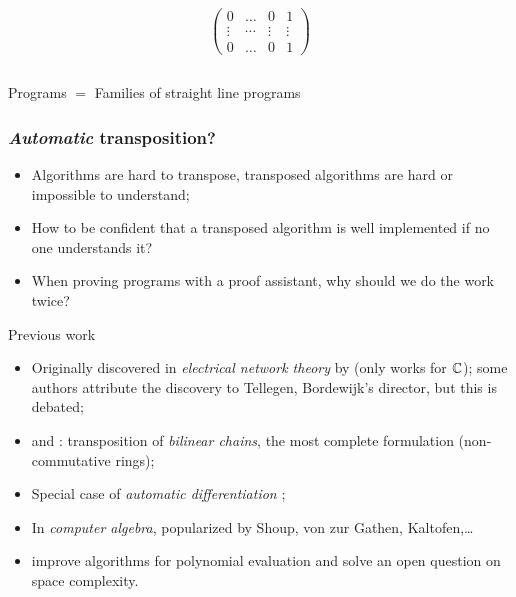 \documentclass[10pt,usepdftitle=false]{beamer}
\begin{document}
\begin{frame}[fragile]
\begin{columns}
    \begin{column}{0.5\textwidth}
      \begin{equation*}
        \begin{pmatrix}
          0 & \hdots & 0 & 1\\
          \vdots  &  \cdots & \vdots & \vdots \\
          0 & \hdots & 0 & 1
        \end{pmatrix}
      \end{equation*}
    \end{column}
  \end{columns}

  \begin{center}
    \large
    Programs $=$ Families of straight line programs
  \end{center}
\end{frame}


\begin{frame}
  \frametitle{\emph{Automatic} transposition?}

  \begin{itemize}
  \item Algorithms are hard to transpose, transposed algorithms are
    hard or impossible to understand;
  \item How to be confident that a transposed algorithm is well
    implemented if no one understands it?
  \item When proving programs with a proof assistant, why should we do
    the work twice?
  \end{itemize}

  \begin{block}{Previous work}
    \begin{itemize}
    \item Originally discovered in \emph{electrical network theory} by
      \cite{bordewijk57} (only works for $\mathbb{C}$); some authors attribute
      the discovery to Tellegen, Bordewijk's director, but this is
      debated;
    \item \cite{fiduccia:phd} and \cite{hopcroft+musinski73}:
      transposition of \emph{bilinear chains}, the most complete
      formulation (non-commutative rings);
    \item Special case of \emph{automatic differentiation}
      \cite{baur+strassen83};
    \item In \emph{computer algebra}, popularized by Shoup, von zur
      Gathen, Kaltofen,\dots
    \item \cite{bostan+lecerf+schost:tellegen} improve algorithms for
      polynomial evaluation and solve an open question on space
      complexity.
    \end{itemize}
  \end{block}
\end{frame}
\end{document}

